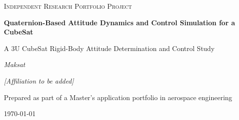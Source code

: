 \begin{titlepage}
\centering

\vspace*{2.0cm}

{\Large \scshape Independent Research Portfolio Project \par}

\vspace{1.5cm}

{\huge \bfseries Quaternion-Based Attitude Dynamics and Control Simulation for a CubeSat \par}

\vspace{1.0cm}

{\large A 3U CubeSat Rigid-Body Attitude Determination and Control Study \par}

\vspace{2.5cm}

{\Large \itshape Maksat \par}
\vspace{0.3cm}
{\normalsize \textit{[Affiliation to be added]} \par}

\vfill

{\large Prepared as part of a Master's application portfolio in aerospace engineering \par}

\vspace{1.0cm}

{\large \today \par}

\end{titlepage}
